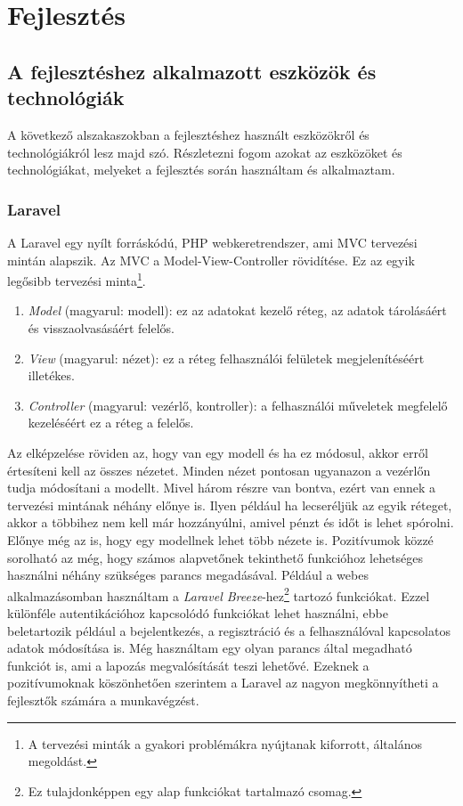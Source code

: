 \documentclass[]{thesis-ekf}
\theoremstyle{definition}
\theoremstyle{remark}
\begin{document}
	\chapter{Fejlesztés}\label{ch-fejlesztes}		
	\section{A fejlesztéshez alkalmazott eszközök és technológiák}
		A következő alszakaszokban a fejlesztéshez használt eszközökről és technológiákról lesz majd szó. Részletezni fogom azokat az eszközöket és technológiákat, melyeket a fejlesztés során használtam és alkalmaztam.
	\subsection{Laravel}\label{sc-laravel}
		A Laravel egy nyílt forráskódú, PHP webkeretrendszer, ami MVC tervezési mintán alapszik. Az MVC a Model-View-Controller rövidítése. Ez az egyik legősibb tervezési minta\footnote{A tervezési minták a gyakori problémákra nyújtanak kiforrott, általános megoldást.}.
		\begin{enumerate}
			\item \emph{Model} (magyarul: modell): ez az adatokat kezelő réteg, az adatok tárolásáért és visszaolvasásáért felelős.
			\item \emph{View} (magyarul: nézet): ez a réteg felhasználói felületek megjelenítéséért illetékes. 
			\item \emph{Controller} (magyarul: vezérlő, kontroller): a felhasználói műveletek megfelelő kezeléséért ez a réteg a felelős.
		\end{enumerate}
		Az elképzelése röviden az, hogy van egy modell és ha ez módosul, akkor erről értesíteni kell az összes nézetet. Minden nézet pontosan ugyanazon a vezérlőn tudja módosítani a modellt. Mivel három részre van bontva, ezért van ennek a tervezési mintának néhány előnye is. Ilyen például ha lecseréljük az egyik réteget, akkor a többihez nem kell már hozzányúlni, amivel pénzt és időt is lehet spórolni. Előnye még az is, hogy egy modellnek lehet több nézete is. Pozitívumok közzé sorolható az még, hogy számos alapvetőnek tekinthető funkcióhoz lehetséges használni néhány szükséges parancs megadásával. Például a webes alkalmazásomban használtam a \emph{Laravel Breeze}-hez\footnote{Ez tulajdonképpen egy alap funkciókat tartalmazó csomag.} tartozó funkciókat. Ezzel különféle autentikációhoz kapcsolódó funkciókat lehet használni, ebbe beletartozik például a bejelentkezés, a regisztráció és a felhasználóval kapcsolatos adatok módosítása is. Még használtam egy olyan parancs által megadható funkciót is, ami a lapozás megvalósítását teszi lehetővé. Ezeknek a pozitívumoknak köszönhetően szerintem a Laravel az nagyon megkönnyítheti a fejlesztők számára a munkavégzést. 
		\cite{Laravel, Kusper}
\end{document}
